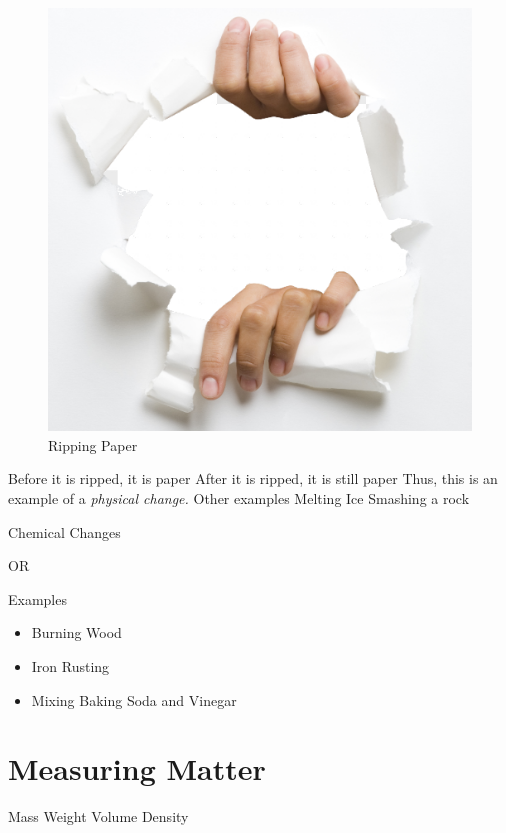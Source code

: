 \documentclass[../../main.tex]{subfiles}
\begin{document}
\begin{outline}[enumerate]
    \begin{figure}[h] %
        \centering %
        \includegraphics[scale=0.25]{./Resources/Images/rippingPaper.png}
        \caption{Ripping Paper} %
        \label{fig:example_image} %
    \end{figure}
    \2 Before it is ripped, it is paper
    \2 After it is ripped, it is still paper
    \3 Thus, this is an example of a \emph{physical change.}
    \2 Other examples
    \3 Melting Ice
    \3 Smashing a rock

    \newpage

    \1 Chemical Changes


    \2 
    \3 

    OR

    \3 

    \2 Examples
    \begin{itemize}
        \item Burning Wood
        \item Iron Rusting
        \item Mixing Baking Soda and Vinegar
    \end{itemize}

    \section{Measuring Matter}
    \1 Mass
    \1 Weight
    \1 Volume
    \1 Density
\end{outline}
\end{document}
